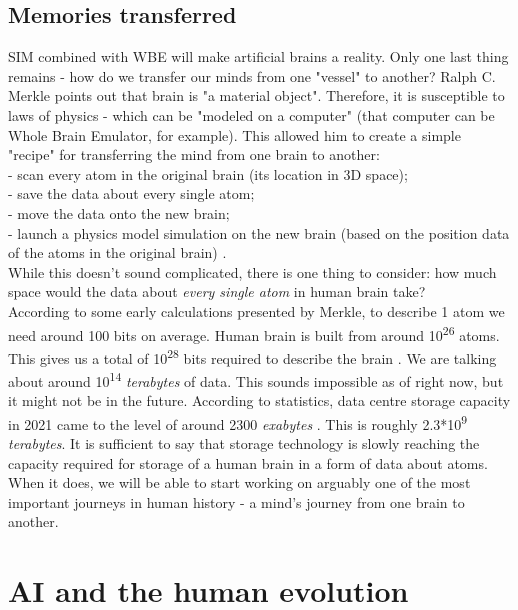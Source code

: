 \documentclass[12pt]{article}
\begin{document}
\subsection{Memories transferred}
	SIM combined with WBE will make artificial brains a reality. Only one last thing remains - how do we transfer our minds from one "vessel" to another? Ralph C. Merkle points out that brain is "a material object". Therefore, it is susceptible to laws of physics - which can be "modeled on a computer" \cite{uploading:1} (that computer can be Whole Brain Emulator, for example). This allowed him to create a simple "recipe" for transferring the mind from one brain to another:
	\\- scan every atom in the original brain (its location in 3D space);
	\\- save the data about every single atom;
	\\- move the data onto the new brain;
	\\- launch a physics model simulation on the new brain (based on the position data of the atoms in the original brain) \cite{uploading:1}.
	\\While this doesn't sound complicated, there is one thing to consider: how much space would the data about \emph{every single atom} in human brain take? 
	\\According to some early calculations presented by Merkle, to describe 1 atom we need around 100 bits on average. Human brain is built from around 10\textsuperscript{26} atoms. This gives us a total of 10\textsuperscript{28} bits required to describe the brain \cite{uploading:1}. We are talking about around 10\textsuperscript{14} \emph{terabytes} of data. This sounds impossible as of right now, but it might not be in the future. According to statistics, data centre storage capacity in 2021 came to the level of around 2300 \emph{exabytes} \cite{statista:capacity}. This is roughly 2.3*10\textsuperscript{9} \emph{terabytes}. It is sufficient to say that storage technology is slowly reaching the capacity required for storage of a human brain in a form of data about atoms. When it does, we will be able to start working on arguably one of the most important journeys in human history - a mind's journey from one brain to another.
\section{AI and the human evolution}
\end{document}
